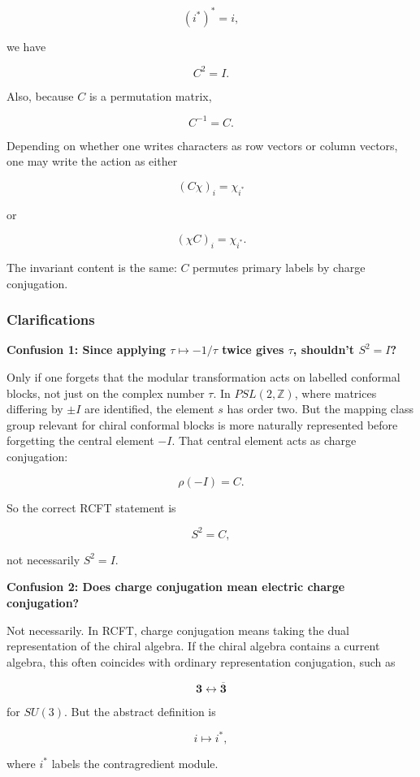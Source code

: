 \documentclass[
  10pt,
  a4paper,
  openany]{book}
\begin{document}
\[
(i^*)^*=i,
\]

we have

\[
C^2=I.
\]

Also, because \(C\) is a permutation matrix,

\[
C^{-1}=C.
\]

Depending on whether one writes characters as row vectors or column
vectors, one may write the action as either

\[
(C\chi)_i=\chi_{i^*}
\]

or

\[
(\chi C)_i=\chi_{i^*}.
\]

The invariant content is the same: \(C\) permutes primary labels by
charge conjugation.

\subsubsection{Clarifications}\label{clarifications-2}

\textbf{Confusion 1: Since applying \(\tau\mapsto -1/\tau\) twice gives
\(\tau\), shouldn't \(S^2=I\)?}

Only if one forgets that the modular transformation acts on labelled
conformal blocks, not just on the complex number \(\tau\). In
\(PSL(2,\mathbb Z)\), where matrices differing by \(\pm I\) are
identified, the element \(s\) has order two. But the mapping class group
relevant for chiral conformal blocks is more naturally represented
before forgetting the central element \(-I\). That central element acts
as charge conjugation:

\[
\rho(-I)=C.
\]

So the correct RCFT statement is

\[
S^2=C,
\]

not necessarily \(S^2=I\).

\textbf{Confusion 2: Does charge conjugation mean electric charge
conjugation?}

Not necessarily. In RCFT, charge conjugation means taking the dual
representation of the chiral algebra. If the chiral algebra contains a
current algebra, this often coincides with ordinary representation
conjugation, such as

\[
\mathbf 3
\leftrightarrow
\overline{\mathbf 3}
\]

for \(SU(3)\). But the abstract definition is

\[
i \mapsto i^*,
\]

where \(i^*\) labels the contragredient module.
\end{document}
